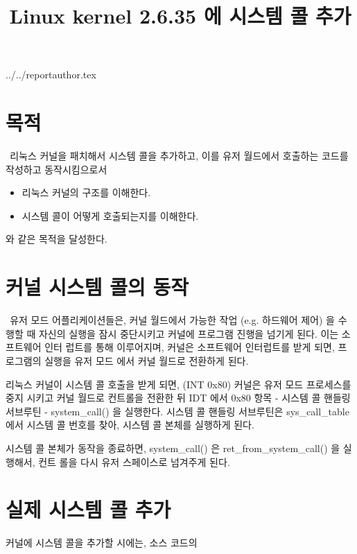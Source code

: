 \documentclass {article}
\begin{document}
\title {Linux kernel 2.6.35 에 시스템 콜 추가}
 {../../reportauthor.tex}
\maketitle

\section {목적}
\(~~\)리눅스 커널을 패치해서 시스템 콜을 추가하고, 이를 유저 월드에서
호출하는 코드를 작성하고 동작시킴으로서

\vspace{\baselineskip}
\begin {itemize}
  \item 리눅스 커널의 구조를 이해한다.
  \item 시스템 콜이 어떻게 호출되는지를 이해한다.
\end {itemize}

\vspace{\baselineskip}
와 같은 목적을 달성한다.

\section {커널 시스템 콜의 동작}

\(~~\)유저 모드 어플리케이션들은, 커널 월드에서 가능한 작업 (e.g. 하드웨어 제어) 을 수행할 때
자신의 실행을 잠시 중단시키고 커널에 프로그램 진행을 넘기게 된다. 이는 소프트웨어 인터\linebreak
럽트를 통해 이루어지며, 커널은 소프트웨어 인터럽트를 받게 되면, 프로그램의 실행을 유저 모드\linebreak
에서 커널 월드로 전환하게 된다.

리눅스 커널이 시스템 콜 호출을 받게 되면, (INT 0x80) 커널은 유저 모드 프로세스를 중지\linebreak
시키고 커널 월드로 컨트롤을 전환한 뒤  IDT 에서 0x80 항목 - 시스템 콜 핸들링 서브루틴 - system\_call() 을 실행한다.
시스템 콜 핸들링 서브루틴은 sys\_call\_table 에서 시스템 콜 번호를 찾아,
시스템 콜 본체를 실행하게 된다.

시스템 콜 본체가 동작을 종료하면, system\_call() 은 ret\_from\_system\_call() 을 실행해서, 컨트\linebreak
롤을 다시 유저 스페이스로 넘겨주게 된다.\cite {michaeljohnson00}

\section {실제 시스템 콜 추가}
커널에 시스템 콜을 추가할 시에는, 소스 코드의
\end{document}
